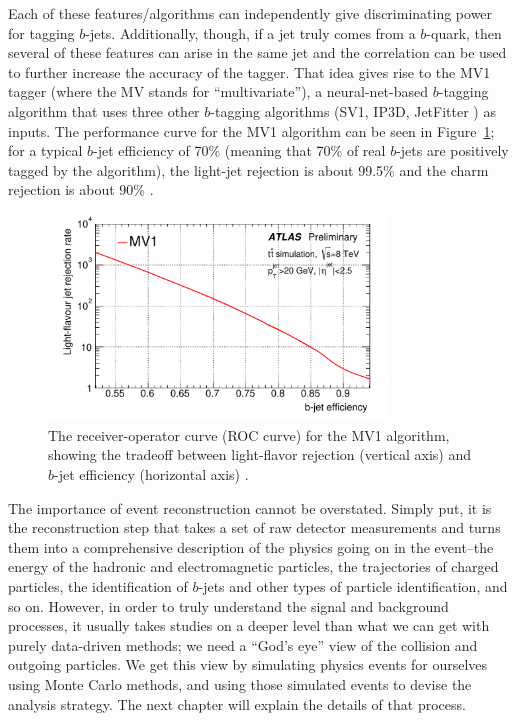 Each of these features/algorithms can independently give discriminating power for tagging $b$-jets.
Additionally, though, if a jet truly comes from a $b$-quark, then several of these features can arise in the 
same jet and the correlation can be used to further increase the accuracy of the tagger.  That idea gives 
rise to the MV1 tagger (where the MV stands for ``multivariate''), a neural-net-based 
$b$-tagging algorithm that uses three other $b$-tagging algorithms (SV1, IP3D, JetFitter
) as inputs.   The performance curve for the MV1 algorithm can be seen in Figure~\ref{fig:mv1_roc}; 
for a typical $b$-jet efficiency of 70\% (meaning that 70\% of real $b$-jets 
are positively tagged by the algorithm), the light-jet rejection is about 99.5\% and the 
charm rejection is about 90\% \cite{b-tagging}.


\begin{figure}
    \center
	\includegraphics[width=0.8\textwidth]{ReconstructionPerformance/images/mv1_roc.pdf}
	\caption{The receiver-operator curve (ROC curve) for the MV1 algorithm, showing the tradeoff
    between light-flavor rejection (vertical axis) and $b$-jet efficiency (horizontal axis)
     \cite{b-tagging}.	\label{fig:mv1_roc}  }
\end{figure}


The importance of event reconstruction cannot be overstated.  Simply 
put, it is the reconstruction step that takes a set of raw detector 
measurements and turns them into a comprehensive description of the 
physics going on in the event--the energy of the hadronic and electromagnetic
particles, the trajectories of charged particles, the identification of 
$b$-jets and other types of particle identification, and so on.  However,
in order to truly understand the signal and background processes, it usually
takes studies on a deeper level than what we can get with purely data-driven methods;
we need a ``God's eye'' view of the collision and outgoing particles.  
We get this view by simulating physics events for ourselves using Monte Carlo
methods, and using those simulated events to devise the analysis strategy.
The next chapter will explain the details of that process.












